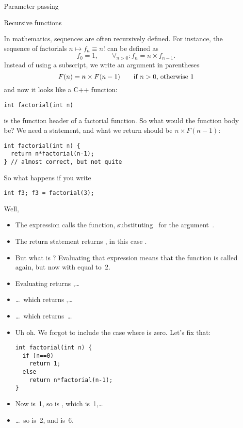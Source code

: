  {Parameter passing}
\label{sec:passing}


 {Recursive functions}
\label{sec:recursion}

In mathematics, sequences are often recursively defined. For instance,
the sequence of factorials $n\mapsto f_n\equiv n!$ can be defined as
\[ f_0=1,\qquad \forall_{n>0}\colon f_n=n\times f_{n-1}. \]
Instead of using a subscript, we write an argument in parentheses
\[ F(n) = n \times F(n-1) \qquad \hbox{if $n>0$, otherwise~$1$} \]
and now it looks like a C++ function:
\begin{lstlisting}
int factorial(int n)
\end{lstlisting}
is the function header of a factorial function. So what would the
function body be? We need a  statement, and what we return
should be $n \times F(n-1)$:
\begin{lstlisting}
int factorial(int n) {
  return n*factorial(n-1);
} // almost correct, but not quite
\end{lstlisting}
So what happens if you write
\begin{lstlisting}
int f3; f3 = factorial(3);
\end{lstlisting}
Well,
\begin{itemize}
\item The expression  calls the 
  function, substituting~ for the argument~.
\item The return statement returns , in this case
  .
\item But what is ? Evaluating that expression means
  that the  function is called again, but now with 
  equal to~2.
\item Evaluating  returns ,\ldots
\item \ldots~which returns ,\ldots
\item \ldots~which returns~\ldots
\item Uh oh. We forgot to include the case where  is zero. Let's
  fix that:
\begin{lstlisting}
int factorial(int n) {
  if (n==0)
    return 1;
  else
    return n*factorial(n-1);
}
\end{lstlisting}
\item Now  is~1, so  is
  , which is~1,\ldots
\item \ldots~so  is~2, and  is~6.
\end{itemize}

